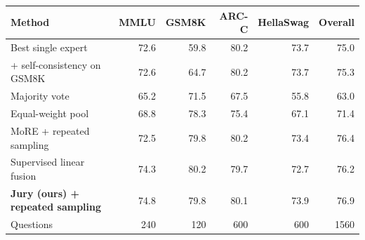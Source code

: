 \begin{tabular}{lrrrrr}
\toprule
Method & MMLU & GSM8K & ARC-C & HellaSwag & Overall \\
\midrule
Best single expert & 72.6 & 59.8 & 80.2 & 73.7 & 75.0 \\
\quad + self-consistency on GSM8K & 72.6 & 64.7 & 80.2 & 73.7 & 75.3 \\
Majority vote & 65.2 & 71.5 & 67.5 & 55.8 & 63.0 \\
Equal-weight pool & 68.8 & 78.3 & 75.4 & 67.1 & 71.4 \\
MoRE + repeated sampling & 72.5 & 79.8 & 80.2 & 73.4 & 76.4 \\
Supervised linear fusion & 74.3 & 80.2 & 79.7 & 72.7 & 76.2 \\
\textbf{Jury (ours) + repeated sampling} & 74.8 & 79.8 & 80.1 & 73.9 & 76.9 \\
\midrule
Questions & 240 & 120 & 600 & 600 & 1560 \\
\bottomrule
\end{tabular}
